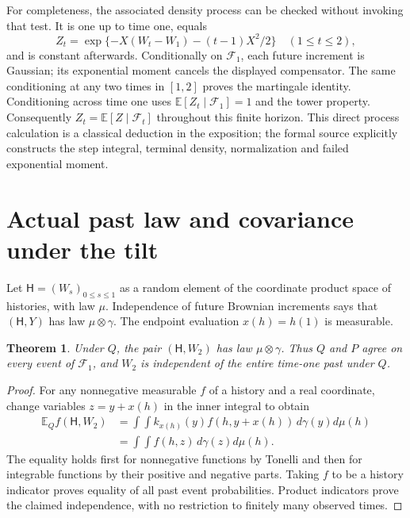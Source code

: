 \documentclass[11pt]{article}
\newtheorem{theorem}{Theorem}[section]
\theoremstyle{remark}\newtheorem{remark}[theorem]{Remark}
\newcommand{\E}{\mathbb E}
\newcommand{\F}{\mathcal F}
\begin{document}
For completeness, the associated density process can be checked without invoking that test. It is one up to time one, equals
\[
 Z_t=\exp\{-X(W_t-W_1)-(t-1)X^2/2\}\quad(1\le t\le2),
\]
and is constant afterwards. Conditionally on $\F_1$, each future increment is Gaussian; its exponential moment cancels the displayed compensator. The same conditioning at any two times in $[1,2]$ proves the martingale identity. Conditioning across time one uses $\E[Z_t\mid\F_1]=1$ and the tower property. Consequently $Z_t=\E[Z\mid\F_t]$ throughout this finite horizon. This direct process calculation is a classical deduction in the exposition; the formal source explicitly constructs the step integral, terminal density, normalization and failed exponential moment.

\section{Actual past law and covariance under the tilt}
Let $\mathsf H=(W_s)_{0\le s\le1}$ as a random element of the coordinate product space of histories, with law $\mu$. Independence of future Brownian increments says that $(\mathsf H,Y)$ has law $\mu\otimes\gamma$. The endpoint evaluation $x(h)=h(1)$ is measurable.

\begin{theorem}\label{thm:past}
Under $Q$, the pair $(\mathsf H,W_2)$ has law $\mu\otimes\gamma$. Thus $Q$ and $P$ agree on every event of $\F_1$, and $W_2$ is independent of the entire time-one past under $Q$.
\end{theorem}
\begin{proof}
For any nonnegative measurable $f$ of a history and a real coordinate, change variables $z=y+x(h)$ in the inner integral to obtain
\begin{align*}
 \E_Q f(\mathsf H,W_2)
 &=\int\!\int k_{x(h)}(y)f(h,y+x(h))\,d\gamma(y)d\mu(h)\\
 &=\int\!\int f(h,z)\,d\gamma(z)d\mu(h).
\end{align*}
The equality holds first for nonnegative functions by Tonelli and then for integrable functions by their positive and negative parts. Taking $f$ to be a history indicator proves equality of all past event probabilities. Product indicators prove the claimed independence, with no restriction to finitely many observed times.
\end{proof}
\end{document}
